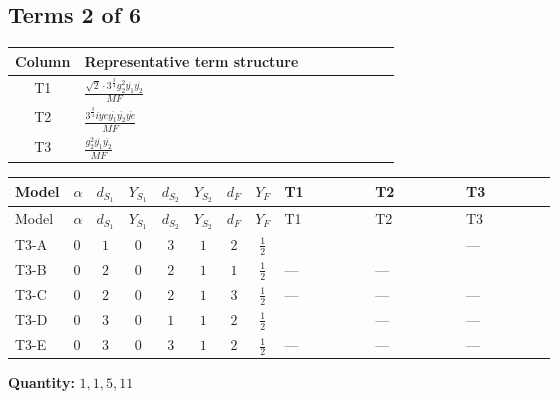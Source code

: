 \documentclass[8pt]{article}
\begin{document}
\begin{landscape}
\subsection*{Terms 2 of 6}
\begin{center}
\begin{tabular}{@{}c >{\raggedright\arraybackslash}p{0.82\linewidth}@{}}
\toprule
Column & Representative term structure \\
\midrule
T1 & \(\displaystyle \frac{\sqrt{2} \cdot 3^{\frac{3}{4}} g_{2}^{2} \overline{y_{1}} \overline{y_{2}}}{MF}\) \\
\midrule
T2 & \(\displaystyle \frac{3^{\frac{3}{4}} i ye \overline{y_{1}} \overline{y_{2}} \overline{ye}}{MF}\) \\
\midrule
T3 & \(\displaystyle \frac{g_{2}^{2} \overline{y_{1}} \overline{y_{2}}}{MF}\) \\
\midrule
\bottomrule
\end{tabular}
\end{center}
\smallskip
\tiny
\begin{longtable}{@{}llcccccc >{\raggedright\arraybackslash}p{0.21\linewidth} >{\raggedright\arraybackslash}p{0.21\linewidth} >{\raggedright\arraybackslash}p{0.21\linewidth}@{}}
\toprule
Model & $\alpha$ & $d_{S_1}$ & $Y_{S_1}$ & $d_{S_2}$ & $Y_{S_2}$ & $d_F$ & $Y_F$ & T1 & T2 & T3 \\
\midrule
\endfirsthead
\toprule
Model & $\alpha$ & $d_{S_1}$ & $Y_{S_1}$ & $d_{S_2}$ & $Y_{S_2}$ & $d_F$ & $Y_F$ & T1 & T2 & T3 \\
\midrule
\endhead
T3-A & $0$ & $1$ & $0$ & $3$ & $1$ & $2$ & $\frac{1}{2}$ & \scriptsize\adjustbox{max width=\linewidth}{$\begin{gathered} \frac{\sqrt{2} \cdot 3^{\frac{3}{4}} g_{2}^{2} \overline{y_{1}} \overline{y_{2}}}{3 MF}\end{gathered}$} & \scriptsize\adjustbox{max width=\linewidth}{$\begin{gathered} \frac{3^{\frac{3}{4}} i ye \overline{y_{1}} \overline{y_{2}} \overline{ye}}{12 MF}\end{gathered}$} & --- \\
\midrule
T3-B & $0$ & $2$ & $0$ & $2$ & $1$ & $1$ & $\frac{1}{2}$ & --- & --- & \scriptsize\adjustbox{max width=\linewidth}{$\begin{gathered} - \frac{3 g_{2}^{2} \overline{y_{1}} \overline{y_{2}}}{4 MF}\end{gathered}$} \\
\midrule
T3-C & $0$ & $2$ & $0$ & $2$ & $1$ & $3$ & $\frac{1}{2}$ & --- & --- & --- \\
\midrule
T3-D & $0$ & $3$ & $0$ & $1$ & $1$ & $2$ & $\frac{1}{2}$ & \scriptsize\adjustbox{max width=\linewidth}{$\begin{gathered} - \frac{\sqrt{2} \cdot 3^{\frac{3}{4}} g_{2}^{2} \overline{y_{1}} \overline{y_{2}}}{3 MF}\end{gathered}$} & --- & --- \\
\midrule
T3-E & $0$ & $3$ & $0$ & $3$ & $1$ & $2$ & $\frac{1}{2}$ & --- & --- & --- \\
\midrule
\bottomrule
\end{longtable}
\clearpage
\noindent\textbf{Quantity: }$\mathrm{1,1,5,11}$\par\smallskip

\end{landscape}
\end{document}
